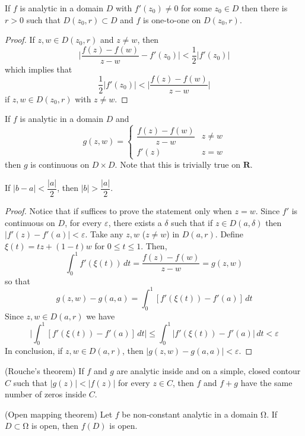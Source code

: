 \begin{thm}
If $f$ is analytic in a domain $D$ with $f'(z_0)\ne 0$ for some $z_0\in D$ then there is $r>0$ such that $D(z_0,r)\subset D$ and $f$ is one-to-one on $D(z_0,r)$. 
\end{thm}
\vspace{2ex}
\begin{proof}
If $z,w\in D(z_0,r)$ and $z\ne w$, then 
\[\Big|\dfrac{f(z)-f(w)}{z-w}-f'(z_0)\Big|<\dfrac{1}{2}|f'(z_0)|\]
which implies that
\[\dfrac{1}{2}|f'(z_0)|<\Big|\dfrac{f(z)-f(w)}{z-w}\Big|\]
if $z,w\in D(z_0,r)$ with $z\ne w$. 
\end{proof}
\vspace{2ex}
\begin{lem}
If $f$ is analytic in a domain $D$ and 
\[g(z,w)=\begin{cases}
\dfrac{f(z)-f(w)}{z-w}&z\ne w\\
f'(z)&z=w
\end{cases}\]
then $g$ is continuous on $D\times D$. Note that this is trivially true on ${\bm R}$.
\end{lem}
\vspace{2ex}
\begin{lem}
If $|b-a|<\dfrac{|a|}{2}$, then $|b|> \dfrac{|a|}{2}$.
\end{lem}
\vspace{2ex}
\begin{proof}
Notice that if suffices to prove the statement only when $z=w$. Since $f'$ is continuous on $D$, for every $\varepsilon $, there exists a $\delta $ such that if $z\in D(a,\delta )$ then $|f'(z)-f'(a)|<\varepsilon $. Take any $z,w$ ($z\ne w$) in $D(a,r)$. Define $\xi (t)=tz+(1-t)w$ for $0\leq t\leq 1$. Then,
\[\int ^{1}_{0}f'(\xi (t))\,dt=\dfrac{f(z)-f(w)}{z-w}=g(z,w)\]
so that
\[g(z,w)-g(a,a)=\int ^{1}_{0}[f'(\xi (t))-f'(a)]\,dt\]
Since $z,w\in D(a,r)$ we have
\[\Big|\int ^{1}_{0}[f'(\xi (t))-f'(a)]\,dt\Big|\leq \int ^{1}_{0}|f'(\xi (t))-f'(a)|\,dt< \varepsilon \]
In conclusion, if $z,w\in D(a,r)$, then $|g(z,w)-g(a,a)|<\varepsilon $. 
\end{proof}
\vspace{2ex}
\begin{thm}
(Rouche's theorem) If $f$ and $g$ are analytic inside and on a simple, closed contour $C$ such that $|g(z)|<|f(z)|$ for every $z\in C$, then $f$ and $f+g$ have the same number of zeros inside $C$.
\end{thm}
\vspace{2ex}
\begin{thm}
(Open mapping theorem) Let $f$ be non-constant analytic in a domain $\mathrm{\Omega}$. If $D\subset \mathrm{\Omega} $ is open, then $f(D)$ is open.
\end{thm}
